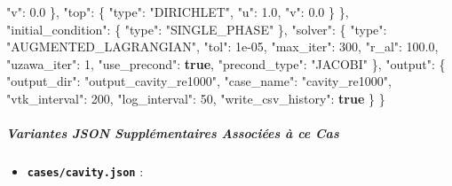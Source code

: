 \documentclass[
  10pt,
]{article}
\newenvironment{Shaded}{}{}
\newcommand{\DataTypeTok}[1]{\textcolor[rgb]{0.56,0.13,0.00}{#1}}
\newcommand{\DecValTok}[1]{\textcolor[rgb]{0.25,0.63,0.44}{#1}}
\newcommand{\FloatTok}[1]{\textcolor[rgb]{0.25,0.63,0.44}{#1}}
\newcommand{\FunctionTok}[1]{\textcolor[rgb]{0.02,0.16,0.49}{#1}}
\newcommand{\KeywordTok}[1]{\textcolor[rgb]{0.00,0.44,0.13}{\textbf{#1}}}
\newcommand{\StringTok}[1]{\textcolor[rgb]{0.25,0.44,0.63}{#1}}
\providecommand{\tightlist}{%
  \setlength{\itemsep}{0pt}\setlength{\parskip}{0pt}}
\begin{document}
\begin{Shaded}
\begin{Highlighting}[]
      \DataTypeTok{"v"}\FunctionTok{:} \FloatTok{0.0}
    \FunctionTok{\},}
    \DataTypeTok{"top"}\FunctionTok{:} \FunctionTok{\{}
      \DataTypeTok{"type"}\FunctionTok{:} \StringTok{"DIRICHLET"}\FunctionTok{,}
      \DataTypeTok{"u"}\FunctionTok{:} \FloatTok{1.0}\FunctionTok{,}
      \DataTypeTok{"v"}\FunctionTok{:} \FloatTok{0.0}
    \FunctionTok{\}}
  \FunctionTok{\},}
  \DataTypeTok{"initial\_condition"}\FunctionTok{:} \FunctionTok{\{}
    \DataTypeTok{"type"}\FunctionTok{:} \StringTok{"SINGLE\_PHASE"}
  \FunctionTok{\},}
  \DataTypeTok{"solver"}\FunctionTok{:} \FunctionTok{\{}
    \DataTypeTok{"type"}\FunctionTok{:} \StringTok{"AUGMENTED\_LAGRANGIAN"}\FunctionTok{,}
    \DataTypeTok{"tol"}\FunctionTok{:} \DecValTok{1e{-}05}\FunctionTok{,}
    \DataTypeTok{"max\_iter"}\FunctionTok{:} \DecValTok{300}\FunctionTok{,}
    \DataTypeTok{"r\_al"}\FunctionTok{:} \FloatTok{100.0}\FunctionTok{,}
    \DataTypeTok{"uzawa\_iter"}\FunctionTok{:} \DecValTok{1}\FunctionTok{,}
    \DataTypeTok{"use\_precond"}\FunctionTok{:} \KeywordTok{true}\FunctionTok{,}
    \DataTypeTok{"precond\_type"}\FunctionTok{:} \StringTok{"JACOBI"}
  \FunctionTok{\},}
  \DataTypeTok{"output"}\FunctionTok{:} \FunctionTok{\{}
    \DataTypeTok{"output\_dir"}\FunctionTok{:} \StringTok{"output\_cavity\_re1000"}\FunctionTok{,}
    \DataTypeTok{"case\_name"}\FunctionTok{:} \StringTok{"cavity\_re1000"}\FunctionTok{,}
    \DataTypeTok{"vtk\_interval"}\FunctionTok{:} \DecValTok{200}\FunctionTok{,}
    \DataTypeTok{"log\_interval"}\FunctionTok{:} \DecValTok{50}\FunctionTok{,}
    \DataTypeTok{"write\_csv\_history"}\FunctionTok{:} \KeywordTok{true}
  \FunctionTok{\}}
\FunctionTok{\}}
\end{Highlighting}
\end{Shaded}

\subparagraph{Variantes JSON Supplémentaires Associées à ce
Cas}\label{variantes-json-suppluxe9mentaires-associuxe9es-uxe0-ce-cas-1}

\begin{itemize}
\tightlist
\item
  \textbf{\texttt{cases/cavity.json}} :
\end{itemize}
\end{document}
